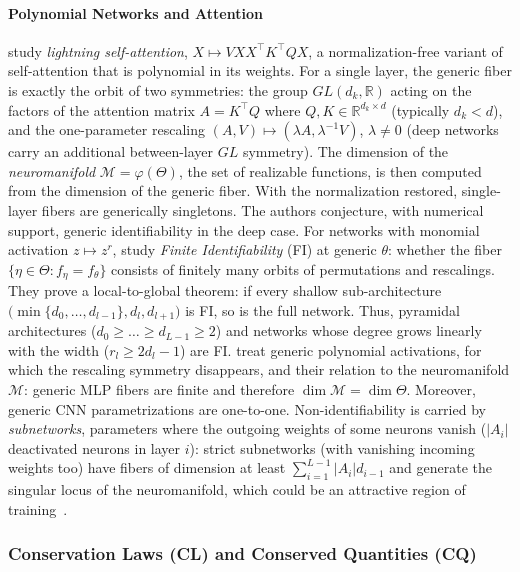 \documentclass[mathematics,review,submit,moreauthors]{Definitions/mdpi}
\begin{document}
\paragraph{Polynomial Networks and Attention}
\citet{henry2025} study \emph{lightning self-attention}, $X\mapsto VXX^{\top}K^{\top}QX$, a normalization-free variant of self-attention that is polynomial in its weights.
For a single layer, the generic fiber is exactly the orbit of two symmetries: the group $GL(d_k,\mathbb{R})$ acting on the factors of the attention matrix $A=K^{\top}Q$ where $Q, K\in \mathbb R^{d_k\times d}$ (typically $d_k<d$), and the one-parameter rescaling $(A,V)\mapsto(\lambda A,\lambda^{-1}V)$, $\lambda\neq0$ (deep networks carry an additional between-layer $GL$ symmetry).
The dimension of the \emph{neuromanifold} $\mathcal{M}=\varphi(\Theta)$, the set of realizable functions, is then computed from the dimension of the generic fiber.
With the normalization restored, single-layer fibers are generically singletons. The authors conjecture, with numerical support, generic identifiability in the deep case.
For networks with monomial activation $z\mapsto z^{r}$, \citet{usevich2025} study \emph{Finite Identifiability} (FI) at generic $\theta$: whether the fiber $\{\eta\in\Theta : f_\eta=f_\theta\}$ consists of finitely many orbits of permutations and rescalings.
They prove a local-to-global theorem: if every shallow sub-architecture $\big(\min\{d_0,\dots,d_{l-1}\},d_l,d_{l+1}\big)$ is FI, so is the full network.
Thus, pyramidal architectures ($d_0\ge\dots\ge d_{L-1}\ge2$) and networks whose degree grows linearly with the width ($r_l\ge 2d_l-1$) are FI.
\citet{shahverdi2026} treat generic polynomial activations, for which the rescaling symmetry disappears, and their relation to the neuromanifold $\mathcal{M}$: generic MLP fibers are finite and therefore $\dim\mathcal{M}=\dim\Theta$.
Moreover, generic CNN parametrizations are one-to-one.
Non-identifiability is carried by \emph{subnetworks}, parameters where the outgoing weights of some neurons vanish ($|A_i|$ deactivated neurons in layer $i$): strict subnetworks (with vanishing incoming weights too) have fibers of dimension at least $\sum_{i=1}^{L-1}|A_i|d_{i-1}$ and generate the singular locus of the neuromanifold, which could be an attractive region of training~\citep{marchetti2025a}.

\subsubsection{Conservation Laws (CL) and Conserved Quantities (CQ)}\label{sec:conservation-laws}
\end{document}
